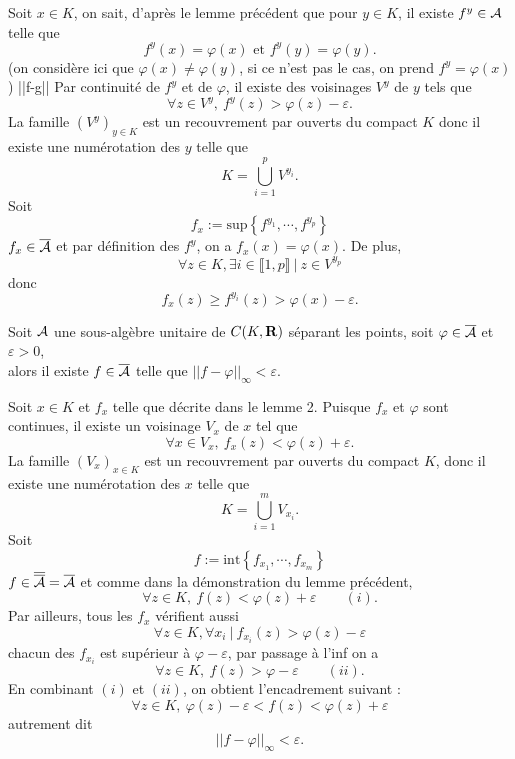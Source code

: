 \documentclass[a4paper,11pt, twoside]{article}
\begin{document}
\begin{Proof}
  Soit $x\in K$, on sait, d'après le lemme précédent que pour $y\in K$, il existe $f^y\in \mathcal A$ telle que 
  $$f^y(x)=\varphi(x)\text{ et }f^y(y)=\varphi(y).$$
  (on considère ici que $\varphi(x)\neq\varphi(y)$, si ce n'est pas le cas, on prend $f^y=\varphi(x)$)
  ||f-g||
  Par continuité de $f^y$ et de $\varphi$, il existe des voisinages $V^y$ de $y$ tels que 
  $$\forall z\in V^y,\ f^y(z)>\varphi(z)-\varepsilon.$$
  La famille $(V^y)_{y\in K}$ est un recouvrement par ouverts du compact $K$ donc il existe une numérotation des $y$ telle que 
  $$K=\bigcup_{i=1}^p V^{y_i}.$$
  Soit 
  $$f_x:=\mathrm{sup}\left\{f^{y_1},\cdots,f^{y_p}\right\}$$
  $f_x\in\overline{\mathcal A}$ et par définition des $f^y$, on a $f_x(x)=\varphi(x)$. De plus,
  $$\forall z\in K,\exists i\in\llbracket 1,p\rrbracket\ |\ z\in V^{y_p}$$
  donc
  $$f_x(z)\geqslant f^{y_i}(z)>\varphi(x)-\varepsilon.$$
\end{Proof}


\begin{lemme}
  Soit $\mathcal A$ une sous-algèbre unitaire de $C(K,\mathbf R)$ séparant les points, soit $\varphi\in\overline{\mathcal A}$ et $\varepsilon>0$,\\

  alors il existe $f\in\overline{\mathcal A}$ telle que $||f-\varphi||_{\infty}<\varepsilon.$
\end{lemme}


\begin{Proof}
  Soit $x\in K$ et $f_x$ telle que décrite dans le lemme 2. Puisque $f_x$ et $\varphi$ sont continues, il existe un voisinage $V_x$ de $x$ tel que 
  $$\forall x\in V_x,\ f_x(z)<\varphi(z)+\varepsilon.$$
  La famille $(V_x)_{x\in K}$ est un recouvrement par ouverts du compact $K$, donc il existe une numérotation des $x$ telle que 
  $$K=\bigcup_{i=1}^m V_{x_i}.$$
  Soit 
  $$f:=\mathrm{int}\left\{f_{x_1},\cdots,f_{x_m}\right\}$$
  $f\in\overline{\overline{\mathcal A}}=\overline{\mathcal A}$ et comme dans la démonstration du lemme précédent, 
  $$\forall z\in K,\ f(z)<\varphi(z)+\varepsilon\qquad (i).$$
  Par ailleurs, tous les $f_x$ vérifient aussi
  $$\forall z\in K,\forall x_i\ |\ f_{x_i}(z)>\varphi(z)-\varepsilon$$
  chacun des $f_{x_i}$ est supérieur à $\varphi-\varepsilon$, par passage à l'inf on a 
  $$\forall z\in K,\ f(z)>\varphi-\varepsilon\qquad (ii).$$
  En combinant $(i)$ et $(ii)$, on obtient l'encadrement suivant :
  $$\forall z\in K,\ \varphi(z)-\varepsilon<f(z)<\varphi(z)+\varepsilon$$
  autrement dit 
  $$||f-\varphi||_{\infty}<\varepsilon.$$
\end{Proof}
\end{document}
